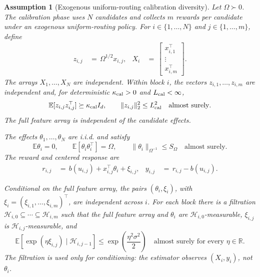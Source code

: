 \documentclass{article} %
\newtheorem{assumption}{Assumption}
\begin{document}
\begin{assumption}[Exogenous uniform-routing calibration diversity]
\label{ass:exogenous-uniform-calibration-diversity-final}
Let \(\Omega\succ0\). The calibration phase uses \(N\) candidates and collects
\(m\) rewards per candidate under an exogenous uniform-routing policy. For
\(i\in\{1,\ldots,N\}\) and \(j\in\{1,\ldots,m\}\), define
\begin{equation}
\begin{aligned}
z_{i,j}
&\,=\,
\Omega^{1/2}x_{i,j},
&
X_i
&\,=\,
\begin{bmatrix}
x_{i,1}^{\top}\\
\vdots\\
x_{i,m}^{\top}
\end{bmatrix}.
\end{aligned}
\end{equation}
The arrays \(X_1,\ldots,X_N\) are independent. Within block \(i\), the
vectors \(z_{i,1},\ldots,z_{i,m}\) are independent and, for deterministic
\(\kappa_{\rm cal}>0\) and \(L_{\rm cal}<\infty\),
\begin{equation}
\mathbb E[z_{i,j}z_{i,j}^{\top}]
\succeq\kappa_{\rm cal}I_d,
\qquad
\|z_{i,j}\|_2^2\leq L_{\rm cal}^2
\quad\text{almost surely}.
\end{equation}
The full feature array is independent of the candidate effects.

The effects \(\theta_1,\ldots,\theta_N\) are i.i.d. and satisfy
\begin{equation}
\mathbb E\theta_i=0,
\qquad
\mathbb E[\theta_i\theta_i^\top]=\Omega,
\qquad
\|\theta_i\|_{\Omega^{-1}}\leq S_\Omega
\quad\text{almost surely}.
\end{equation}
The reward and centered response are
\begin{equation}
\begin{aligned}
r_{i,j}
&\,=\,
b(u_{i,j})+x_{i,j}^{\top}\theta_i+\xi_{i,j},
&
y_{i,j}
&\,=\,
r_{i,j}-b(u_{i,j}).
\end{aligned}
\end{equation}

Conditional on the full feature array, the pairs
\((\theta_i,\xi_i)\), with
\(\xi_i=(\xi_{i,1},\ldots,\xi_{i,m})^\top\), are independent across \(i\).
For each block there is a filtration
\(\mathcal H_{i,0}\subseteq\cdots\subseteq\mathcal H_{i,m}\) such that the
full feature array and \(\theta_i\) are \(\mathcal H_{i,0}\)-measurable,
\(\xi_{i,j}\) is \(\mathcal H_{i,j}\)-measurable, and
\begin{equation}
\mathbb E\!\left[
\exp(\eta\xi_{i,j})\mid\mathcal H_{i,j-1}
\right]
\leq
\exp\!\left(\frac{\eta^2\sigma^2}{2}\right)
\quad\text{almost surely for every }\eta\in\mathbb R.
\end{equation}
The filtration is used only for conditioning: the estimator observes
\((X_i,y_i)\), not \(\theta_i\).
\end{assumption}
\end{document}
